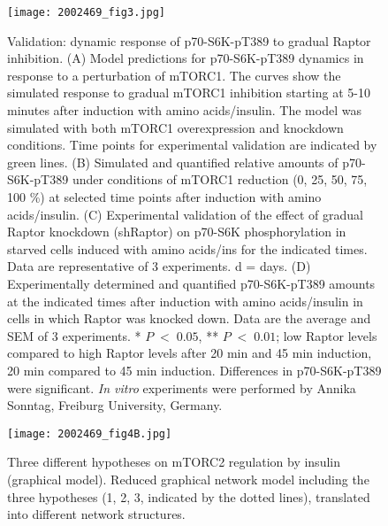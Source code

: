 \begin{figure}[tb]
	\begin{center}
		\texttt{[image: 2002469\_fig3.jpg]}
		\caption[Validation: dynamic response of p70-S6K-pT389 to gradual Raptor inhibition]{Validation: dynamic response of p70-S6K-pT389 to gradual Raptor inhibition. (A) Model predictions for p70-S6K-pT389 dynamics in response to a perturbation of mTORC1. The curves show the simulated response to gradual mTORC1 inhibition starting at 5-10 minutes after induction with amino acids/insulin. The model was simulated with both mTORC1 overexpression and knockdown conditions. Time points for experimental validation are indicated by green lines. (B) Simulated and quantified relative amounts of p70-S6K-pT389 under conditions of mTORC1 reduction (0, 25, 50, 75, 100 \%) at selected time points after induction with amino acids/insulin. (C) Experimental validation of the effect of gradual Raptor knockdown (shRaptor) on p70-S6K phosphorylation in starved cells induced with amino acids/ins for the indicated times. Data are representative of 3 experiments. d = days. (D) Experimentally determined and quantified p70-S6K-pT389 
amounts at the indicated times after induction with amino acids/insulin in cells in which Raptor was knocked down. Data are the average and SEM of 3 experiments. * $P\;<\;0.05$, ** $P\;<\;0.01$; low Raptor levels compared to high Raptor levels after 20 min and 45 min induction, 20 min compared to 45 min induction.  Differences in p70-S6K-pT389 were significant. \emph{In vitro} experiments were performed by Annika Sonntag, Freiburg University, Germany.}
		\label{fig:2002469_fig3}
	\end{center}
\end{figure}
\clearpage

\begin{figure}[tb]
	\begin{center}
		\texttt{[image: 2002469\_fig4B.jpg]}
		\caption[Three different hypotheses on mTORC2 regulation by insulin (graphical model)]{Three different hypotheses on mTORC2 regulation by insulin (graphical model). Reduced graphical network model including the three hypotheses (1, 2, 3, indicated by the dotted lines), translated into different network structures.}
		\label{fig:2002469_fig4B}
	\end{center}
\end{figure}
\clearpage


